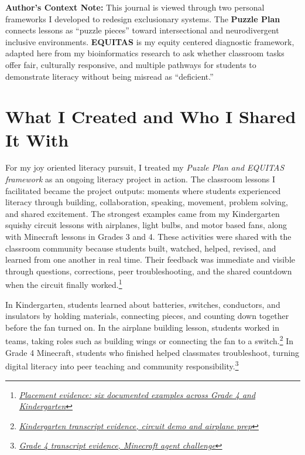 \documentclass[11pt]{article}
\begin{document}
\begin{titlepage}
\begin{center}
\begin{minipage}{0.86\textwidth}
\vspace{0.8in}

\tiny\centering\textbf{Author's Context Note:} This journal is viewed through two personal frameworks I developed to redesign exclusionary systems. The \textbf{Puzzle Plan} connects lessons as ``puzzle pieces'' toward intersectional and neurodivergent inclusive environments. \textbf{EQUITAS} is my equity centered diagnostic framework, adapted here from my bioinformatics research to ask whether classroom tasks offer fair, culturally responsive, and multiple pathways for students to demonstrate literacy without being misread as ``deficient.''
\end{minipage}
\end{center}

\restoregeometry
\end{titlepage}
\clearpage

\doublespacing

\section*{What I Created and Who I Shared It With}

For my joy oriented literacy pursuit, I treated my \textit{Puzzle Plan and EQUITAS framework} as an ongoing literacy project in action. The classroom lessons I facilitated became the project outputs: moments where students experienced literacy through building, collaboration, speaking, movement, problem solving, and shared excitement. The strongest examples came from my Kindergarten squishy circuit lessons with airplanes, light bulbs, and motor based fans, along with Minecraft lessons in Grades 3 and 4. These activities were shared with the classroom community because students built, watched, helped, revised, and learned from one another in real time. Their feedback was immediate and visible through questions, corrections, peer troubleshooting, and the shared countdown when the circuit finally worked.\footnote{\href{https://github.com/pzg8794/EDU498-joy_oriented_literacy_pursuit_journal/blob/main/joy-evidence-from-placement.md}{\textit{Placement evidence: six documented examples across Grade 4 and Kindergarten}}}

In Kindergarten, students learned about batteries, switches, conductors, and insulators by holding materials, connecting pieces, and counting down together before the fan turned on. In the airplane building lesson, students worked in teams, taking roles such as building wings or connecting the fan to a switch.\footnote{\href{https://github.com/pzg8794/EDU498-joy_oriented_literacy_pursuit_journal/blob/main/kindergarten-circuit-demo-airplane-prep-evidence.md}{\textit{Kindergarten transcript evidence, circuit demo and airplane prep}}} In Grade 4 Minecraft, students who finished helped classmates troubleshoot, turning digital literacy into peer teaching and community responsibility.\footnote{\href{https://github.com/pzg8794/EDU498-joy_oriented_literacy_pursuit_journal/blob/main/grade-4-minecraft-agent-challenge-evidence.md}{\textit{Grade 4 transcript evidence, Minecraft agent challenge}}}
\end{document}
